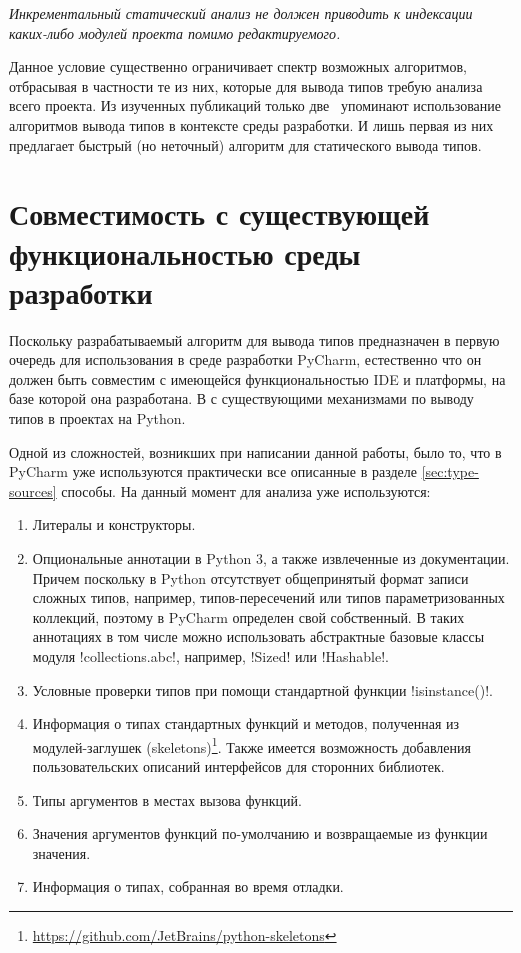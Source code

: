 \emph{Инкрементальный статический анализ не должен приводить к индексации 
 каких-либо модулей проекта помимо редактируемого.}

Данное условие существенно ограничивает спектр возможных алгоритмов, отбрасывая
в частности те из них, которые для вывода типов требую анализа всего проекта. Из
 изученных публикаций только две~\cite{Pluquet2009,Haupt2011} упоминают
использование алгоритмов вывода типов в контексте среды разработки. И лишь
первая из них предлагает быстрый (но неточный) алгоритм для статического вывода типов.

\section{Совместимость с существующей функциональностью среды разработки}

Поскольку разрабатываемый алгоритм для вывода типов предназначен в первую
очередь для использования в среде разработки PyCharm, естественно что он должен
быть совместим с имеющейся функциональностью IDE и платформы, на базе которой
она разработана. В с существующими механизмами по выводу типов в проектах на
Python. 

Одной из сложностей, возникших при написании данной работы, было то, что в
PyCharm уже используются практически все описанные в разделе
\ref{sec:type-sources} способы. На данный момент для анализа уже используются:

\begin{enumerate}
    \item{%
        Литералы и конструкторы.
      }
    \item{%
        Опциональные аннотации в Python 3, а также извлеченные из
        документации. Причем поскольку в Python отсутствует общепринятый формат
        записи сложных типов, например, типов-пересечений или типов
        параметризованных коллекций, поэтому в PyCharm определен свой собственный.
        В таких аннотациях в том числе можно использовать абстрактные базовые
        классы модуля !collections.abc!, например, !Sized! или !Hashable!.
    }
    \item{%
        Условные проверки типов при помощи стандартной функции !isinstance()!.
      }
    \item{%
        Информация о типах стандартных функций и методов, полученная из
        модулей-заглушек
        (skeletons)\footnote{\url{https://github.com/JetBrains/python-skeletons}}.
        Также имеется возможность добавления пользовательских описаний
        интерфейсов для сторонних библиотек.
      }
    \item{%
        Типы аргументов в местах вызова функций.
      }
    \item{%
        Значения аргументов функций по-умолчанию и возвращаемые из функции
        значения.
      }
    \item{%
        Информация о типах, собранная во время отладки.
      }
\end{enumerate}


